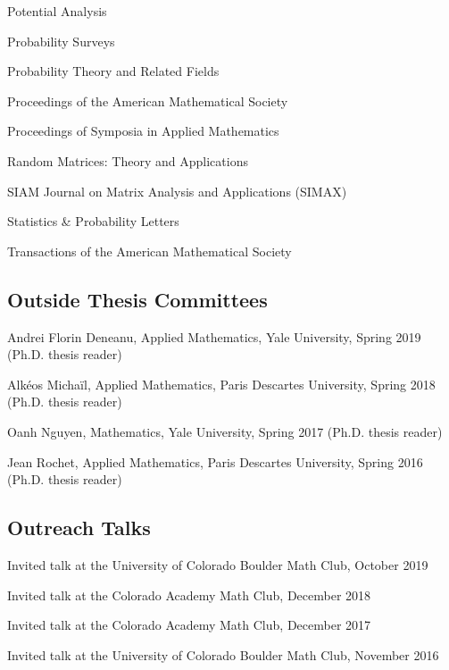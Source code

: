 \documentclass[letterpaper]{article}
\renewenvironment{itemize}{
  \begin{list}{}{
    \setlength{\leftmargin}{1em}
  }
}{
  \end{list}
}
\begin{document}
\begin{itemize}
\begin{itemize}
		\item Potential Analysis
		\item Probability Surveys
		\item Probability Theory and Related Fields
		\item Proceedings of the American Mathematical Society
		\item Proceedings of Symposia in Applied Mathematics
		\item Random Matrices: Theory and Applications
		\item SIAM Journal on Matrix Analysis and Applications (SIMAX)
		\item Statistics \& Probability Letters
		\item Transactions of the American Mathematical Society
	\end{itemize}
\end{itemize}

\subsection*{Outside Thesis Committees}
\begin{itemize}
	\item Andrei Florin Deneanu, Applied Mathematics, Yale University, Spring 2019 (Ph.D. thesis reader)
	\item  Alk\'{e}os Micha\"{i}l, Applied Mathematics, Paris Descartes University, Spring 2018 (Ph.D. thesis reader)
	\item Oanh Nguyen, Mathematics, Yale University, Spring 2017 (Ph.D. thesis reader)
	\item Jean Rochet, Applied Mathematics, Paris Descartes University, Spring 2016 (Ph.D. thesis reader)
\end{itemize}

\subsection*{Outreach Talks} 
\begin{itemize}
\item Invited talk at the University of Colorado Boulder Math Club, October 2019
\item Invited talk at the Colorado Academy Math Club, December 2018
\item Invited talk at the Colorado Academy Math Club, December 2017
\item Invited talk at the University of Colorado Boulder Math Club, November 2016
\end{itemize}
\end{document}
